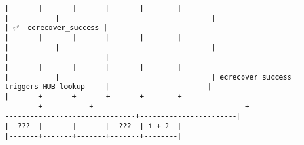 \documentclass[varwidth=\maxdimen,margin=0.5cm,multi={verbatim}]{standalone}
\begin{document}
\begin{verbatim}
|       |       |       |       |        |                                    |           |                                    |                                           | ✅  ecrecover_success |
|       |       |       |       |        |                                    |           |                                    |                                           |                       |
|       |       |       |       |        |                                    |           |                                    | ecrecover_success triggers HUB lookup     |                       |
|-------+-------+-------+-------+--------+------------------------------------+-----------+------------------------------------+-------------------------------------------+-----------------------|
|  ???  |       |       |  ???  | i + 2  |
|-------+-------+-------+-------+--------|

\end{verbatim}
\end{document}
